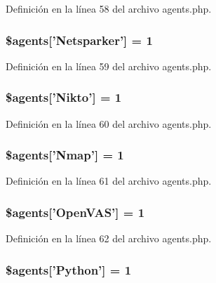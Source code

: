 Definición en la línea 58 del archivo agents.\-php.

\hypertarget{agents_8php_a9266c5fc2d80e6e54c419b6aaa06487e}{
\subsubsection[{\$agents}]{\setlength{\rightskip}{0pt plus 5cm}\$agents\mbox{[}'Netsparker'\mbox{]} = 1}}\label{agents_8php_a9266c5fc2d80e6e54c419b6aaa06487e}


Definición en la línea 59 del archivo agents.\-php.

\hypertarget{agents_8php_a90c59b5719baa1cb102c7dd820f28e61}{
\subsubsection[{\$agents}]{\setlength{\rightskip}{0pt plus 5cm}\$agents\mbox{[}'Nikto'\mbox{]} = 1}}\label{agents_8php_a90c59b5719baa1cb102c7dd820f28e61}


Definición en la línea 60 del archivo agents.\-php.

\hypertarget{agents_8php_a6c369038b4d690edeffa8621b897acc0}{
\subsubsection[{\$agents}]{\setlength{\rightskip}{0pt plus 5cm}\$agents\mbox{[}'Nmap'\mbox{]} = 1}}\label{agents_8php_a6c369038b4d690edeffa8621b897acc0}


Definición en la línea 61 del archivo agents.\-php.

\hypertarget{agents_8php_accce65048167d00a453b8d716016f364}{
\subsubsection[{\$agents}]{\setlength{\rightskip}{0pt plus 5cm}\$agents\mbox{[}'Open\-V\-A\-S'\mbox{]} = 1}}\label{agents_8php_accce65048167d00a453b8d716016f364}


Definición en la línea 62 del archivo agents.\-php.

\hypertarget{agents_8php_a8311b49c2a38df88d9a5739df1e88f30}{
\subsubsection[{\$agents}]{\setlength{\rightskip}{0pt plus 5cm}\$agents\mbox{[}'Python'\mbox{]} = 1}}\label{agents_8php_a8311b49c2a38df88d9a5739df1e88f30}


